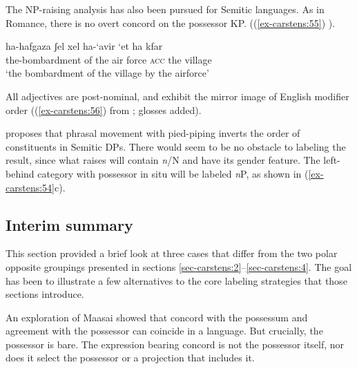 \documentclass[output=paper
,modfonts
,nonflat]{langsci/langscibook}
\begin{document}
The NP-raising analysis has also been pursued for Semitic languages. As in Romance, there is no overt concord on the possessor KP. ((\ref{ex-carstens:55}) \citealt[1470]{Shlonsky2004}).

\begin{exe}
\ex \label{ex-carstens:55}
\gll ha-hafgaza          ʃel xel     ha-‘avir     ‘et     ha     kfar\\
the-bombardment  of  the   air force   \textsc{acc}   the   village\\
\glt `the bombardment of the village by the airforce'
\end{exe}
All adjectives are post-nominal, and exhibit the mirror image of English modifier order ((\ref{ex-carstens:56}) from \citealt[1485]{Shlonsky2004}; glosses added).

\citet{Shlonsky2004} proposes that phrasal movement with pied-piping inverts the order of constituents in Semitic DPs. There would seem to be no obstacle to labeling the result, since what raises will contain \textit{n}/N and have its gender feature. The left-behind category with possessor in situ will be labeled \textit{n}P, as shown in (\ref{ex-carstens:54}c).

\subsection{Interim summary} \label{sec-carstens:6.5}
This section provided a brief look at three cases that differ from the two polar opposite groupings presented in sections \ref{sec-carstens:2}--\ref{sec-carstens:4}. The goal has been to illustrate a few alternatives to the core labeling strategies that those sections introduce. 

An exploration of Maasai showed that concord with the possessum and agreement with the possessor can coincide in a language. But crucially, the possessor is bare. The expression bearing concord is not the possessor itself, nor does it select the possessor or a projection that includes it.  
\end{document}
